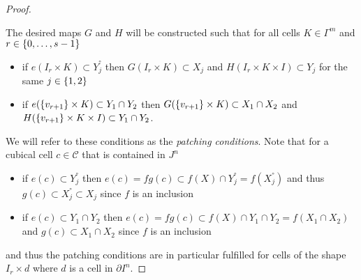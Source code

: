 \begin{prop}
\begin{proof}
\begin{center}
        \end{center}
        The desired maps $G$ and $H$ will be constructed such that for all cells $K\in\Gamma^m$ and $r\in\left\lbrace0,\ldots,s-1\right\rbrace$
        \begin{itemize}
            \item if $e(I_r\times K)\subset Y_j^°$ then $G(I_r\times K)\subset X_j$ and $H(I_r\times K\times I)\subset Y_j$ for the same $j\in\left\lbrace1,2\right\rbrace$
            \item if $e(\left\lbrace v_{r+1}\right\rbrace\times K)\subset Y_1\cap Y_2$ then $G(\left\lbrace v_{r+1}\right\rbrace\times K)\subset X_1\cap X_2$ and $H(\left\lbrace v_{r+1}\right\rbrace\times K\times I)\subset Y_1\cap Y_2$.
        \end{itemize}
        We will refer to these conditions as the \emph{patching conditions}.
        Note that for a cubical cell $c\in\mathcal{C}$ that is contained in $J^n$
        \begin{itemize}
            \item if $e(c)\subset Y_j^°$ then $e(c)=fg(c)\subset f(X)\cap Y_j^°=f(X_j^°)$ and thus $g(c)\subset X_j^°\subset X_j$ since $f$ is an inclusion
            \item if $e(c)\subset Y_1\cap Y_2$ then $e(c)=fg(c)\subset f(X)\cap Y_1\cap Y_2=f(X_1\cap X_2)$ and $g(c)\subset X_1\cap X_2$ since $f$ is an inclusion
        \end{itemize}
        and thus the patching conditions are in particular fulfilled for cells of the shape $I_r\times d$ where $d$ is a cell in $\partial I^n$.
        

\end{proof}
\end{prop}
